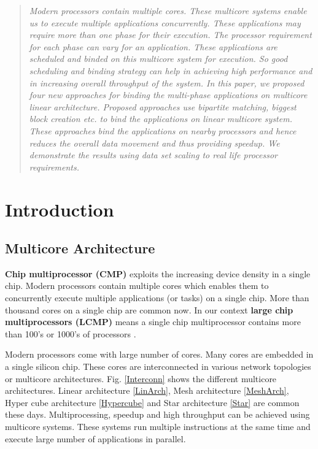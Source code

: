 \documentclass[10pt, conference]{IEEEtran}
\begin{document}



\maketitle
\begin{abstract}
\normalsize
\textit{Modern processors contain multiple cores. These multicore systems enable us to execute multiple applications concurrently. These applications may require more than one phase for their execution. The processor requirement for each phase can vary for an application. These applications are scheduled and binded on this multicore system for execution. So good scheduling and binding strategy can help in achieving high performance and in increasing overall throughput of the system. In this paper, we proposed four new approaches for binding the multi-phase applications on multicore linear architecture. Proposed approaches use bipartite matching, biggest block creation etc. to bind the applications on linear multicore system. These approaches bind the applications on nearby processors and hence reduces the overall data movement and thus providing speedup. We demonstrate the results using data set scaling to real life processor requirements.
}
\end{abstract}
\IEEEpeerreviewmaketitle

\section{Introduction}

\subsection{Multicore Architecture}
{\bf Chip multiprocessor (CMP)} exploits the increasing device density in a single chip. Modern processors contain multiple cores which enables them to concurrently execute  multiple applications (or tasks) on a single chip.  More than thousand cores on a single chip are common now. In our context { \bf large chip multiprocessors (LCMP)}  means a single chip multiprocessor contains more than 100's or 1000's of processors \cite{lcmpintel}. 

Modern processors come with large number of cores. Many cores are embedded in a single silicon chip. These cores are interconnected in various network topologies or multicore architectures. Fig. \ref{Interconn} shows the different multicore architectures. Linear architecture \ref{LinArch}, Mesh architecture \ref{MeshArch}, Hyper cube architecture \ref{Hypercube} and Star architecture \ref{Star} are common these days. Multiprocessing, speedup and high throughput can be achieved using multicore systems. These systems run multiple instructions at the same time and execute large number of applications in parallel.
\end{document}
